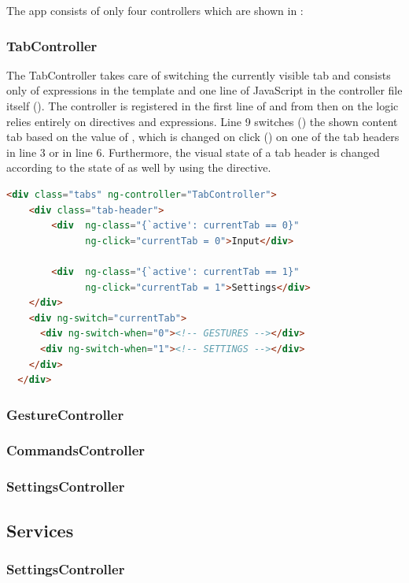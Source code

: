 The app consists of only four controllers which are shown in :

\subsubsection{TabController}

The TabController takes care of switching the currently visible tab and consists only of expressions in the template and one line of JavaScript in the controller file itself (). The controller is registered in the first line of  and from then on the logic relies entirely on directives and expressions. Line 9 switches () the shown content tab based on the value of , which is changed on click () on one of the tab headers in line 3 or in line 6. Furthermore, the visual state of a tab header is changed according to the state of  as well by using the  directive.

\begin{lstlisting}[language=HTML, caption=TabController expressions, label=lst:tab-controller]
  <div class="tabs" ng-controller="TabController">
    <div class="tab-header">
        <div  ng-class="{`active': currentTab == 0}"
              ng-click="currentTab = 0">Input</div>

        <div  ng-class="{`active': currentTab == 1}"
              ng-click="currentTab = 1">Settings</div>
    </div>
    <div ng-switch="currentTab">
      <div ng-switch-when="0"><!-- GESTURES --></div>
      <div ng-switch-when="1"><!-- SETTINGS --></div>
    </div>
  </div>
\end{lstlisting}

\subsubsection{GestureController}



\subsubsection{CommandsController}

\subsubsection{SettingsController}

\subsection{Services}

\subsubsection{SettingsController}
